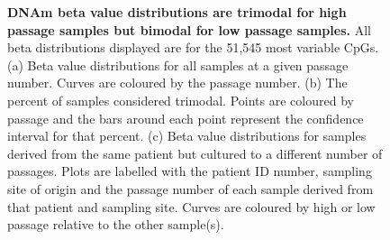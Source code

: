 \documentclass[a4paper]{article}
\begin{document}
\begin{figure}
\begin{flushleft}

\caption{\textbf{DNAm beta value distributions are trimodal for high passage samples but bimodal for low passage samples.} All beta distributions displayed are for the 51,545 most variable CpGs. (a) Beta value distributions for all samples at a given passage number. Curves are coloured by the passage number. (b) The percent of samples considered trimodal. Points are coloured by passage and the bars around each point represent the confidence interval for that percent. (c) Beta value distributions for samples derived from the same patient but cultured to a different number of passages. Plots are labelled with the patient ID number, sampling site of origin and the passage number of each sample derived from that patient and sampling site. Curves are coloured by high or low passage relative to the other sample(s).}
\label{fig:main}
\end{flushleft}
\end{figure}
\end{document}

